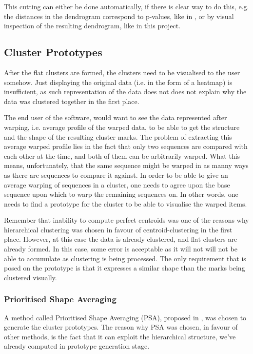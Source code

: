 \documentclass[parskip]{cs4rep}
\begin{document}
This cutting can either be done automatically, if there is clear way to do this, e.g. the distances in the dendrogram correspond to p-values, like in \cite{Wang:2012cb}, or by visual inspection of the resulting dendrogram, like in this project.


\subsection{Cluster Prototypes}
\label{sec:prototypes}

After the flat clusters are formed, the clusters need to be visualised to the user somehow. Just displaying the original data (i.e. in the form of a heatmap) is insufficient, as such representation of the data does not does not explain why the data was clustered together in the first place. 

The end user of the software, would want to see the data represented after warping, i.e. average profile of the warped data, to be able to get the structure and the shape of the resulting cluster marks. The problem of extracting this average warped profile lies in the fact that only two sequences are compared with each other at the time, and both of them can be arbitrarily warped. What this means, unfortunately, that the same sequence might be warped in as manny ways as there are sequences to compare it against. In order to be able to give an average warping of sequences in a cluster, one needs to agree upon the base sequence upon which to warp the remaining sequences on. In other words,
one needs to find a prototype for the cluster to be able to visualise the warped items.

Remember that inability to compute perfect centroids was one of the reasons why hierarchical clustering was chosen in favour of centroid-clustering in the first place. However, at this case the data is already clustered, and flat clusters are already formed. In this case, some error is acceptable as it will not will not be able to accumulate as clustering is being processed. The only requirement that is posed on the prototype is that it expresses a similar shape than the marks being clustered visually.


\subsubsection{Prioritised Shape Averaging}
A method called Prioritised Shape Averaging (PSA), proposed in \cite{Niennattrakul:2009ep}, was chosen to generate the cluster prototypes. The reason why PSA was chosen, in favour of other methods, is the fact that it can exploit the hierarchical structure, we've already computed in prototype generation stage.
\end{document}
